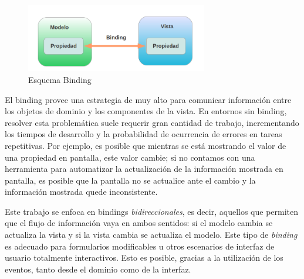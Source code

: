 		\begin{figure}[h]
			\centering
			\includegraphics[width=300px]{img/binding}
			\caption{Esquema Binding}
			\label{fig:binding}
		\end{figure}
		
		\bigskip
	
	El binding provee una estrategia de muy alto para comunicar información entre
	los objetos de dominio y los componentes de la vista.
	En entornos sin binding, resolver esta problemática suele requerir gran
	cantidad de trabajo, incrementando los tiempos de desarrollo y la probabilidad
	de ocurrencia de errores en tareas repetitivas.
	Por ejemplo, es posible que mientras se está mostrando el valor de una
	propiedad en pantalla, este valor cambie; si no contamos con una herramienta
	para automatizar la actualización de la información mostrada en
	pantalla, es posible que la pantalla no se actualice ante el cambio
	y la información mostrada quede inconsistente.

	\medskip

	Este trabajo se enfoca en bindings \emph{bidireccionales}, es decir, aquellos
	que permiten que el flujo de información vaya en ambos sentidos: si el
	modelo cambia se actualiza la vista y si la vista cambia se actualiza el
	modelo.
	Este tipo de \emph{binding} es adecuado para formularios modificables u otros
	escenarios de interfaz de usuario totalmente interactivos.
	Esto es posible, gracias a la utilización de los eventos, tanto desde el
	dominio como de la interfaz.
	
% 	
% 	
% 	
% 		
% 	
% 		 
% 	
% 	


